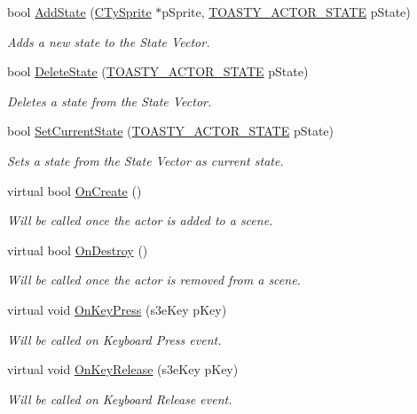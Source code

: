 \begin{DoxyCompactItemize}
bool \hyperlink{class_i_ty_actor_aad869e863d1dc2283d7b33bd2aa02e4b}{AddState} (\hyperlink{class_c_ty_sprite}{CTySprite} $\ast$pSprite, \hyperlink{_ty_actor_8h_aceba83227db82b051b04ff8e90d63a51}{TOASTY\_\-ACTOR\_\-STATE} pState)
\begin{DoxyCompactList}\small\item\em Adds a new state to the State Vector. \end{DoxyCompactList}\item 
bool \hyperlink{class_i_ty_actor_a64f9104dbcf4bccbc17121d81b40c9cb}{DeleteState} (\hyperlink{_ty_actor_8h_aceba83227db82b051b04ff8e90d63a51}{TOASTY\_\-ACTOR\_\-STATE} pState)
\begin{DoxyCompactList}\small\item\em Deletes a state from the State Vector. \end{DoxyCompactList}\item 
bool \hyperlink{class_i_ty_actor_ab7a324bf10f138f537fe2b869d3aeea5}{SetCurrentState} (\hyperlink{_ty_actor_8h_aceba83227db82b051b04ff8e90d63a51}{TOASTY\_\-ACTOR\_\-STATE} pState)
\begin{DoxyCompactList}\small\item\em Sets a state from the State Vector as current state. \end{DoxyCompactList}\item 
virtual bool \hyperlink{class_i_ty_actor_aeff5d073d59e661d58e9bdc72370769c}{OnCreate} ()
\begin{DoxyCompactList}\small\item\em Will be called once the actor is added to a scene. \end{DoxyCompactList}\item 
virtual bool \hyperlink{class_i_ty_actor_a1ceb6a35987a22acb85bdaf9fd23f349}{OnDestroy} ()
\begin{DoxyCompactList}\small\item\em Will be called once the actor is removed from a scene. \end{DoxyCompactList}\item 
virtual void \hyperlink{class_i_ty_actor_a3a3295eba0fc092e44a9b690d2d242ab}{OnKeyPress} (s3eKey pKey)
\begin{DoxyCompactList}\small\item\em Will be called on Keyboard Press event. \end{DoxyCompactList}\item 
virtual void \hyperlink{class_i_ty_actor_ae0402203392a84e769fad4a989d07b3c}{OnKeyRelease} (s3eKey pKey)
\begin{DoxyCompactList}\small\item\em Will be called on Keyboard Release event. \end{DoxyCompactList}\item 

\end{DoxyCompactItemize}
